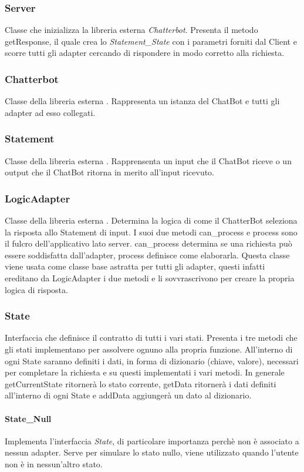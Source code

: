 \subsubsection{Server} Classe che inizializza la libreria esterna \textit{Chatterbot}. Presenta il metodo getResponse, il quale crea lo \textit{Statement\_State} con i parametri forniti dal Client e scorre tutti gli adapter cercando di rispondere in modo corretto alla richiesta. 
\subsubsection{Chatterbot} Classe della libreria esterna . Rappresenta un istanza del ChatBot e tutti gli adapter ad esso collegati.
\subsubsection{Statement} Classe della libreria esterna . Rapprensenta un input che il ChatBot riceve o un output che il ChatBot ritorna in merito all'input ricevuto.
\subsubsection{LogicAdapter} Classe della libreria esterna . Determina la logica di come il ChatterBot seleziona la risposta allo Statement di input. I suoi due metodi can\_process e process sono il fulcro dell'applicativo lato server. can\_process determina se una richiesta può essere soddisfatta dall'adapter, process definisce come elaborarla. Questa classe viene usata come classe base astratta per tutti gli adapter, questi infatti ereditano da LogicAdapter i due metodi e li sovvrascrivono per creare la propria logica di risposta.
\subsubsection{State} Interfaccia che definisce il contratto di tutti i vari stati. Presenta i tre metodi che gli stati implementano per assolvere ognuno alla propria funzione. All'interno di ogni State saranno definiti i dati, in forma di dizionario (chiave, valore),  necessari per completare la richiesta e su questi implementati i vari metodi. In generale getCurrentState ritornerà lo stato corrente, getData ritornerà i dati definiti all'interno di ogni State e addData aggiungerà un dato al dizionario.
\paragraph*{State\_Null} Implementa l'interfaccia \textit{State}, di particolare importanza perchè non è associato a nessun adapter. Serve per simulare lo stato nullo, viene utilizzato quando l'utente non è in nessun'altro stato.
